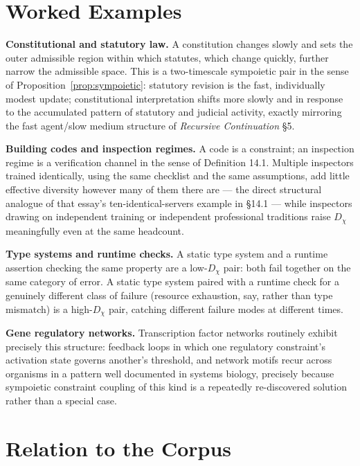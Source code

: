 \documentclass[11pt]{article}
\begin{document}
\section{Worked Examples}

\textbf{Constitutional and statutory law.} A constitution changes slowly and sets the outer admissible region within which statutes, which change quickly, further narrow the admissible space. This is a two-timescale sympoietic pair in the sense of Proposition~\ref{prop:sympoietic}: statutory revision is the fast, individually modest update; constitutional interpretation shifts more slowly and in response to the accumulated pattern of statutory and judicial activity, exactly mirroring the fast agent/slow medium structure of \emph{Recursive Continuation} \S 5.

\textbf{Building codes and inspection regimes.} A code is a constraint; an inspection regime is a verification channel in the sense of Definition 14.1. Multiple inspectors trained identically, using the same checklist and the same assumptions, add little effective diversity however many of them there are — the direct structural analogue of that essay's ten-identical-servers example in \S 14.1 — while inspectors drawing on independent training or independent professional traditions raise $D_\chi$ meaningfully even at the same headcount.

\textbf{Type systems and runtime checks.} A static type system and a runtime assertion checking the same property are a low-$D_\chi$ pair: both fail together on the same category of error. A static type system paired with a runtime check for a genuinely different class of failure (resource exhaustion, say, rather than type mismatch) is a high-$D_\chi$ pair, catching different failure modes at different times.

\textbf{Gene regulatory networks.} Transcription factor networks routinely exhibit precisely this structure: feedback loops in which one regulatory constraint's activation state governs another's threshold, and network motifs recur across organisms in a pattern well documented in systems biology, precisely because sympoietic constraint coupling of this kind is a repeatedly re-discovered solution rather than a special case.

\section{Relation to the Corpus}
\end{document}
